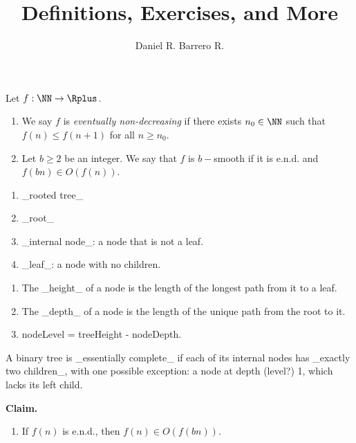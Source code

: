 \documentclass{amsart}
\title{Definitions, Exercises, and More}
\author{Daniel R. Barrero R.}
\begin{document}
\maketitle

\begin{defn}
	Let $f : \NN \to \Rplus$.
	\begin{enumerate}
		\item We say $f$ is \emph{eventually non-decreasing} if there exists $n_0 \in \NN$ such that $f(n) \leq f(n+1)$ for all $n \geq n_0$.
		\item Let $b \geq 2$ be an integer. We say that $f$ is $b-$smooth if it is e.n.d. and $f(bn) \in O(f(n))$.
	\end{enumerate}
\end{defn}

\bigskip


\begin{defn}
	\begin{enumerate}
		\item _rooted tree_
		\item _root_
		\item _internal node_: a node that is not a leaf.
		\item _leaf_: a node with no children.
	\end{enumerate}
\end{defn}

\bigskip

\begin{defn}
	\begin{enumerate}
		\item The _height_ of a node is the length of the longest path from it to a leaf.
		\item The _depth_ of a node is the length of the unique path from the root to it.
		\item nodeLevel = treeHeight - nodeDepth.
	\end{enumerate}

\end{defn}

\bigskip

\begin{defn}
	A binary tree is _essentially complete_ if each of its internal nodes has _exactly two children_, with one possible exception: a node at depth (level?) 1, which lacks its left child. %
\end{defn}

\bigskip

\textbf{Claim.}

\begin{enumerate}
	\item If $f(n)$ is e.n.d., then $f(n) \in O(f(bn))$.
\end{enumerate}
\end{document}
